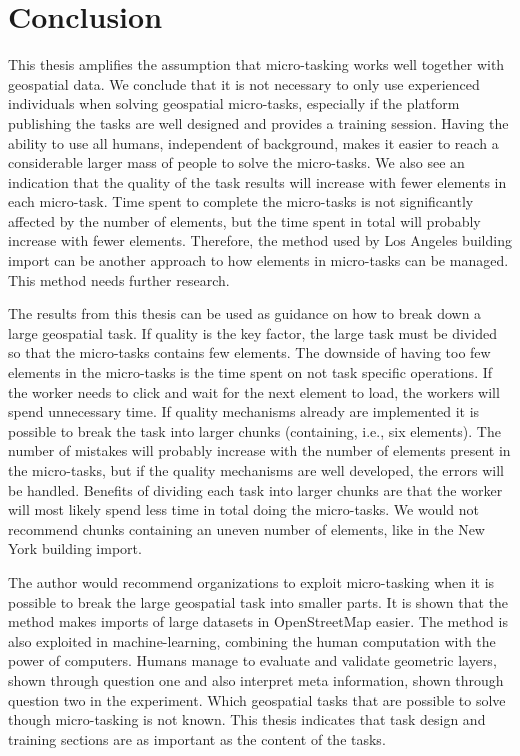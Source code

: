 \chapter{Conclusion}

This thesis amplifies the assumption that micro-tasking works well together with geospatial data. We conclude that it is not necessary to only use experienced individuals when solving geospatial micro-tasks, especially if the platform publishing the tasks are well designed and provides a training session. Having the ability to use all humans, independent of background, makes it easier to reach a considerable larger mass of people to solve the micro-tasks. We also see an indication that the quality of the task results will increase with fewer elements in each micro-task. Time spent to complete the micro-tasks is not significantly affected by the number of elements, but the time spent in total will probably increase with fewer elements. Therefore, the method used by Los Angeles building import can be another approach to how elements in micro-tasks can be managed. This method needs further research.

The results from this thesis can be used as guidance on how to break down a large geospatial task. If quality is the key factor, the large task must be divided so that the micro-tasks contains few elements. The downside of having too few elements in the micro-tasks is the time spent on not task specific operations. If the worker needs to click and wait for the next element to load, the workers will spend unnecessary time. If quality mechanisms already are implemented it is possible to break the task into larger chunks (containing, i.e., six elements). The number of mistakes will probably increase with the number of elements present in the micro-tasks, but if the quality mechanisms are well developed, the errors will be handled. Benefits of dividing each task into larger chunks are that the worker will most likely spend less time in total doing the micro-tasks. We would not recommend chunks containing an uneven number of elements, like in the New York building import. 

The author would recommend organizations to exploit micro-tasking when it is possible to break the large geospatial task into smaller parts. It is shown that the method makes imports of large datasets in OpenStreetMap easier. The method is also exploited in machine-learning, combining the human computation with the power of computers. Humans manage to evaluate and validate geometric layers, shown through question one and also interpret meta information, shown through question two in the experiment. Which geospatial tasks that are possible to solve though micro-tasking is not known. This thesis indicates that task design and training sections are as important as the content of the tasks.


